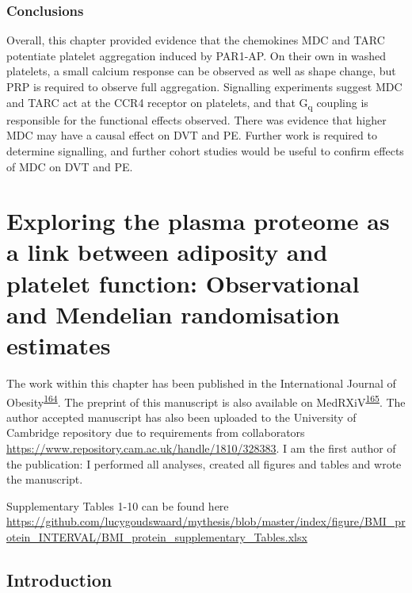 \documentclass[11pt,twoside]{bristolthesis}
\begin{document}
\hypertarget{conclusions}{%
\subsection{Conclusions}\label{conclusions}}

Overall, this chapter provided evidence that the chemokines MDC and TARC potentiate platelet aggregation induced by PAR1-AP. On their own in washed platelets, a small calcium response can be observed as well as shape change, but PRP is required to observe full aggregation. Signalling experiments suggest MDC and TARC act at the CCR4 receptor on platelets, and that G\textsubscript{q} coupling is responsible for the functional effects observed. There was evidence that higher MDC may have a causal effect on DVT and PE. Further work is required to determine signalling, and further cohort studies would be useful to confirm effects of MDC on DVT and PE.

\hypertarget{BMI-protein-MR}{%
\chapter{Exploring the plasma proteome as a link between adiposity and platelet function: Observational and Mendelian randomisation estimates}\label{BMI-protein-MR}}

The work within this chapter has been published in the International Journal of Obesity\textsuperscript{\protect\hyperlink{ref-Goudswaard2021}{164}}. The preprint of this manuscript is also available on MedRXiV\textsuperscript{\protect\hyperlink{ref-Goudswaard2020}{165}}. The author accepted manuscript has also been uploaded to the University of Cambridge repository due to requirements from collaborators \url{https://www.repository.cam.ac.uk/handle/1810/328383}. I am the first author of the publication: I performed all analyses, created all figures and tables and wrote the manuscript.

Supplementary Tables 1-10 can be found here \url{https://github.com/lucygoudswaard/mythesis/blob/master/index/figure/BMI_protein_INTERVAL/BMI_protein_supplementary_Tables.xlsx}

\hypertarget{introduction}{%
\section{Introduction}\label{introduction}}
\end{document}
